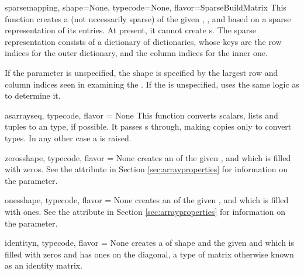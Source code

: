 \begin{funcdesc}{sparse}{mapping, shape=None, typecode=None, flavor=SparseBuildMatrix}
  This function creates a (not necessarily sparse)  of
  the given , , and  based on
  a sparse representation of its entries. At present, it cannot create
  s. The sparse representation consists of a dictionary
  of dictionaries, whose keys are the row indices for the outer dictionary,
  and the column indices for the inner one.

  If the  parameter is unspecified, the shape is specified by
  the largest row and column indices seen in examining the .
  If the  is unspecified,  uses the same
  logic as  to determine it.
\end{funcdesc}

\begin{funcdesc}{asarray}{seq, typecode, flavor = None}
  This function converts scalars, lists and tuples to an
   type, if possible. It passes s through,
  making copies only to convert types.  In any other case a
   is raised.
\end{funcdesc}

\begin{funcdesc}{zeros}{shape, typecode, flavor = None}
   creates an  of the given ,
   and  which is filled with zeros. See the
   attribute in Section \ref{sec:arrayproperties} for
  information on the  parameter.
\end{funcdesc}

\begin{funcdesc}{ones}{shape, typecode, flavor = None}
   creates an  of the given ,
   and  which is filled with ones. See the
   attribute in Section \ref{sec:arrayproperties} for
  information on the  parameter.
\end{funcdesc}

\begin{funcdesc}{identity}{n, typecode, flavor = None}
   creates a  of shape  and
  the given  and  which is filled with
  zeros and has ones on the diagonal, a type of matrix otherwise
  known as an identity matrix.
\end{funcdesc}

